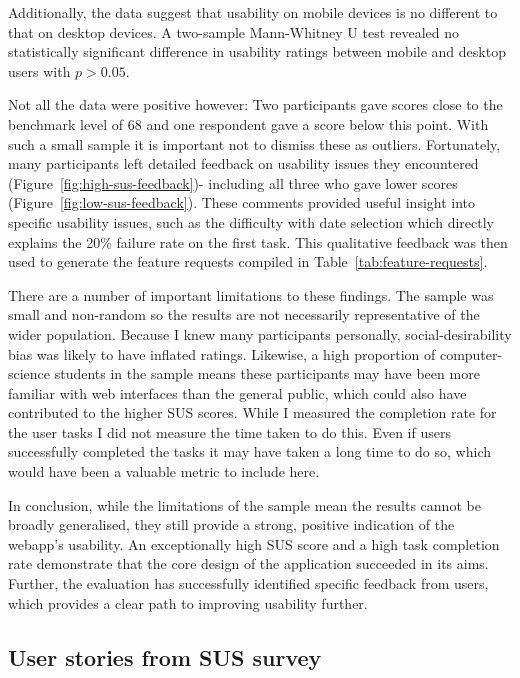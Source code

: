 Additionally, the data suggest that usability on mobile devices is no different
to that on desktop devices. A two-sample Mann-Whitney U test revealed no
statistically significant difference in usability ratings between mobile and
desktop users with \(p>0.05\).

Not all the data were positive however: Two participants gave scores close to
the benchmark level of 68 and one respondent gave a score below this point. With
such a small sample it is important not to dismiss these as outliers.
Fortunately, many participants left detailed feedback on usability issues they
encountered (Figure~\ref{fig:high-sus-feedback})- including all three who gave
lower scores (Figure~\ref{fig:low-sus-feedback}). These comments provided useful
insight into specific usability issues, such as the difficulty with date
selection which directly explains the 20\% failure rate on the first task. This
qualitative feedback was then used to generate the feature requests compiled in
Table~\ref{tab:feature-requests}.

There are a number of important limitations to these findings. The sample was small
and non-random so the results are not necessarily representative of the wider
population. Because I knew many participants personally, social-desirability
bias was likely to have inflated ratings. Likewise, a high proportion of
computer-science students in the sample means these participants may have been
more familiar with web interfaces than the general public, which could also have
contributed to the higher SUS scores. While I measured the completion rate for
the user tasks I did not measure the time taken to do this. Even if users
successfully completed the tasks it may have taken a long time to do so, which
would have been a valuable metric to include here.

In conclusion, while the limitations of the sample mean the results cannot be
broadly generalised, they still provide a strong, positive indication of the
webapp's usability. An exceptionally high SUS score and a high task completion
rate demonstrate that the core design of the application succeeded in its aims.
Further, the evaluation has successfully identified specific feedback from
users, which provides a clear path to improving usability further.

\subsection{User stories from SUS survey} \label{sec:user-story}

